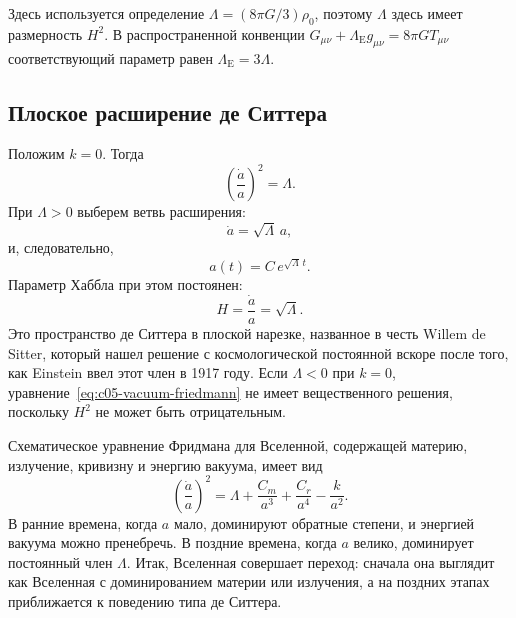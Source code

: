 \begin{remark}
Здесь используется определение \(\Lambda=(8\pi G/3)\rho_0\), поэтому \(\Lambda\) здесь имеет размерность \(H^2\). В распространенной конвенции \(G_{\mu\nu}+\Lambda_{\mathrm E}g_{\mu\nu}=8\pi G T_{\mu\nu}\) соответствующий параметр равен \(\Lambda_{\mathrm E}=3\Lambda\).
\end{remark}

\subsection{Плоское расширение де Ситтера}

Положим \(k=0\). Тогда
\begin{equation}
\left(\frac{\dot a}{a}\right)^2=\Lambda.
\end{equation}
При \(\Lambda>0\) выберем ветвь расширения:
\begin{equation}
\dot a=\sqrt{\Lambda}\,a,
\end{equation}
и, следовательно,
\begin{equation}
a(t)=C\,e^{\sqrt{\Lambda}\,t}.
\end{equation}
Параметр Хаббла при этом постоянен:
\begin{equation}
H=\frac{\dot a}{a}=\sqrt{\Lambda}.
\end{equation}
Это пространство де Ситтера в плоской нарезке, названное в честь Willem de Sitter, который нашел решение с космологической постоянной вскоре после того, как Einstein ввел этот член в 1917 году. Если \(\Lambda<0\) при \(k=0\), уравнение~\eqref{eq:c05-vacuum-friedmann} не имеет вещественного решения, поскольку \(H^2\) не может быть отрицательным.

\begin{classroomqa}
\end{classroomqa}

Схематическое уравнение Фридмана для Вселенной, содержащей материю, излучение, кривизну и энергию вакуума, имеет вид
\begin{equation}
\left(\frac{\dot a}{a}\right)^2
=
\Lambda+\frac{C_m}{a^3}+\frac{C_r}{a^4}-\frac{k}{a^2}.
\label{eq:c05-mixed-friedmann}
\end{equation}
В ранние времена, когда \(a\) мало, доминируют обратные степени, и энергией вакуума можно пренебречь. В поздние времена, когда \(a\) велико, доминирует постоянный член \(\Lambda\). Итак, Вселенная совершает переход: сначала она выглядит как Вселенная с доминированием материи или излучения, а на поздних этапах приближается к поведению типа де Ситтера.

